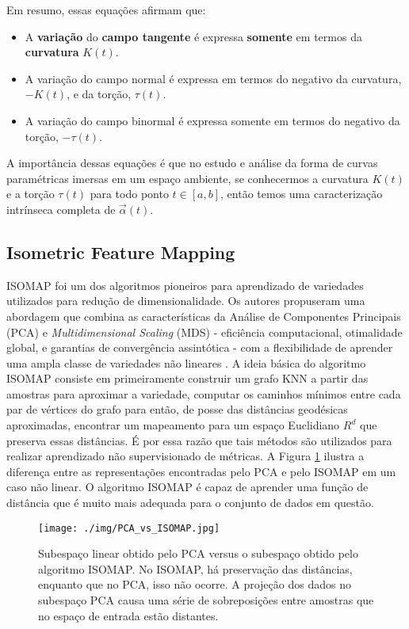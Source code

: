 \documentclass[a4paper,12pt]{article}
\begin{document}
Em resumo, essas equações afirmam que:

\begin{itemize}
	\item A \textbf{variação} do \textbf{campo tangente} é expressa \textbf{somente} em termos da \textbf{curvatura} $K(t)$.
	\item A variação do campo normal é expressa em termos do negativo da curvatura, $-K(t)$, e da torção, $\tau(t)$.
	\item A variação do campo binormal é expressa somente em termos do negativo da torção, $-\tau(t)$.
\end{itemize}

A importância dessas equações é que no estudo e análise da forma de curvas paramétricas imersas em um espaço ambiente, se conhecermos a curvatura $K(t)$ e a torção $\tau(t)$ para todo ponto $t \in [a, b]$, então temos uma caracterização intrínseca completa de $\vec{\alpha}(t)$.

\subsection{Isometric Feature Mapping}
\noindent
ISOMAP foi um dos algoritmos pioneiros para aprendizado de variedades utilizados para redução de dimensionalidade. Os autores propuseram uma abordagem que combina as características da Análise de Componentes Principais (PCA) e \emph{Multidimensional Scaling} (MDS) \cite{MDS,MDS2} - eficiência computacional, otimalidade global, e garantias de convergência assintótica - com a flexibilidade de aprender uma ampla classe de variedades não lineares \cite{Isomap}. A ideia básica do algoritmo ISOMAP consiste em primeiramente construir um grafo KNN a partir das amostras para aproximar a variedade, computar os caminhos mínimos entre cada par de vértices do grafo para então, de posse das distâncias geodésicas aproximadas, encontrar um mapeamento para um espaço Euclidiano $R^d$ que preserva essas distâncias. É por essa razão que tais métodos são utilizados para realizar aprendizado não supervisionado de métricas. A Figura \ref{fig:PCA_vs_ISOMAP} ilustra a diferença entre as representações encontradas pelo PCA e pelo ISOMAP em um caso não linear. O algoritmo ISOMAP é capaz de aprender uma função de distância que é muito mais adequada para o conjunto de dados em questão.

\begin{figure}[ht]
\centerline{\texttt{[image: ./img/PCA\_vs\_ISOMAP.jpg]}}
\vspace*{8pt}
\caption{Subespaço linear obtido pelo PCA versus o subespaço obtido pelo algoritmo ISOMAP. No ISOMAP, há preservação das distâncias, enquanto que no PCA, isso não ocorre. A projeção dos dados no subespaço PCA causa uma série de sobreposições entre amostras que no espaço de entrada estão distantes.}
\label{fig:PCA_vs_ISOMAP}
\end{figure}
\end{document}
